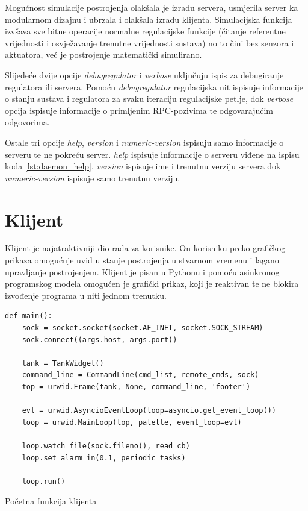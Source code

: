 Mogućnost simulacije postrojenja olakšala je izradu servera, usmjerila server ka
modularnom dizajnu i ubrzala i olakšala izradu klijenta. Simulacijska funkcija
izvšava sve bitne operacije normalne regulacijske funkcije (čitanje referentne
vrijednosti i osvježavanje trenutne vrijednosti sustava) no to čini bez senzora
i aktuatora, već je postrojenje matematički simulirano.

Slijedeće dvije opcije \emph{debugregulator} i \emph{verbose} uključuju ispis za
debugiranje regulatora ili servera. Pomoću \emph{debugregulator} regulacijska nit
ispisuje informacije o stanju sustava i regulatora za svaku iteraciju
regulacijske petlje, dok \emph{verbose} opcija ispisuje informacije o primljenim
RPC-pozivima te odgovarajućim odgovorima.

Ostale tri opcije \emph{help}, \emph{version} i \emph{numeric-version} ispisuju
samo informacije o serveru te ne pokreću server. \emph{help} ispisuje
informacije o serveru viđene na ispisu koda \ref{lst:daemon_help},
\emph{version} ispisuje ime i trenutnu verziju servera dok
\emph{numeric-version} ispisuje samo trenutnu verziju.

\newpage
\section{Klijent}

Klijent je najatraktivniji dio rada za korisnike. On korisniku preko grafičkog prikaza
omogućuje uvid u stanje postrojenja u stvarnom vremenu i lagano
upravljanje postrojenjem. Klijent je pisan u Pythonu i pomoću asinkronog
programskog modela omogućen je grafički prikaz, koji je reaktivan te ne blokira
izvođenje programa u niti jednom trenutku.

\begin{listing}[H]
\centering
\begin{verbatim}
def main():
    sock = socket.socket(socket.AF_INET, socket.SOCK_STREAM)
    sock.connect((args.host, args.port))

    tank = TankWidget()
    command_line = CommandLine(cmd_list, remote_cmds, sock)
    top = urwid.Frame(tank, None, command_line, 'footer')

    evl = urwid.AsyncioEventLoop(loop=asyncio.get_event_loop())
    loop = urwid.MainLoop(top, palette, event_loop=evl)

    loop.watch_file(sock.fileno(), read_cb)
    loop.set_alarm_in(0.1, periodic_tasks)

    loop.run()
\end{verbatim}
\caption{Početna funkcija klijenta}
\label{lst:client main}
\end{listing}

